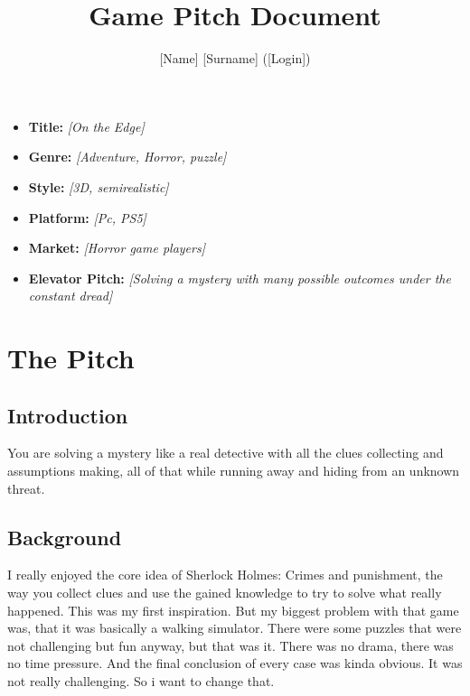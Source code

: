 \documentclass[a4paper,10pt,english]{article}
\title{%
Game Pitch Document%
}
\author{%
[Name] [Surname] ([Login])%
}
\date{}
\newcommand{\ph}[1]{\textit{[#1]}}
\begin{document}
\maketitle
\thispagestyle{empty}

{%
\large

\begin{itemize}

\item[] \textbf{Title:} \ph{On the Edge}

\item[] \textbf{Genre:} \ph{Adventure, Horror, puzzle}

\item[] \textbf{Style:} \ph{3D, semirealistic}

\item[] \textbf{Platform:} \ph{Pc, PS5}

\item[] \textbf{Market:} \ph{Horror game players}

\item[] \textbf{Elevator Pitch:} \ph{Solving a mystery with many possible outcomes under the constant dread}

\end{itemize}

}

\section*{\centering The Pitch}

\subsection*{Introduction}
You are solving a mystery like a real detective with all the clues collecting and assumptions making, all of that while running away and hiding from an unknown threat.


\subsection*{Background}

I really enjoyed the core idea of Sherlock Holmes: Crimes and punishment, the way you collect clues and use the gained knowledge to try to solve what really happened. This was my first inspiration. But my biggest problem with that game was, that it was basically a walking simulator. There were some puzzles that were not challenging but fun anyway, but that was it. There was no drama, there was no time pressure. And the final conclusion of every case was kinda obvious. It was not really challenging. So i want to change that.\newline
\end{document}
